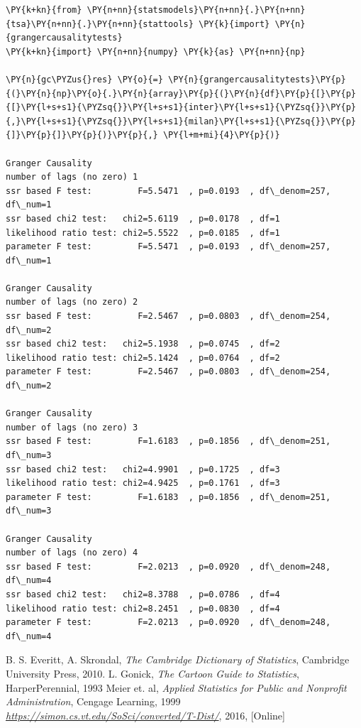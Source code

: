 \begin{codebox}[breakable, size=fbox, boxrule=1pt, pad at break*=1mm,colback=cellbackground, colframe=cellborder]
\begin{Verbatim}[commandchars=\\\{\}]
\PY{k+kn}{from} \PY{n+nn}{statsmodels}\PY{n+nn}{.}\PY{n+nn}{tsa}\PY{n+nn}{.}\PY{n+nn}{stattools} \PY{k}{import} \PY{n}{grangercausalitytests}
\PY{k+kn}{import} \PY{n+nn}{numpy} \PY{k}{as} \PY{n+nn}{np}

\PY{n}{gc\PYZus{}res} \PY{o}{=} \PY{n}{grangercausalitytests}\PY{p}{(}\PY{n}{np}\PY{o}{.}\PY{n}{array}\PY{p}{(}\PY{n}{df}\PY{p}{[}\PY{p}{[}\PY{l+s+s1}{\PYZsq{}}\PY{l+s+s1}{inter}\PY{l+s+s1}{\PYZsq{}}\PY{p}{,}\PY{l+s+s1}{\PYZsq{}}\PY{l+s+s1}{milan}\PY{l+s+s1}{\PYZsq{}}\PY{p}{]}\PY{p}{]}\PY{p}{)}\PY{p}{,} \PY{l+m+mi}{4}\PY{p}{)}

Granger Causality
number of lags (no zero) 1
ssr based F test:         F=5.5471  , p=0.0193  , df\_denom=257, df\_num=1
ssr based chi2 test:   chi2=5.6119  , p=0.0178  , df=1
likelihood ratio test: chi2=5.5522  , p=0.0185  , df=1
parameter F test:         F=5.5471  , p=0.0193  , df\_denom=257, df\_num=1

Granger Causality
number of lags (no zero) 2
ssr based F test:         F=2.5467  , p=0.0803  , df\_denom=254, df\_num=2
ssr based chi2 test:   chi2=5.1938  , p=0.0745  , df=2
likelihood ratio test: chi2=5.1424  , p=0.0764  , df=2
parameter F test:         F=2.5467  , p=0.0803  , df\_denom=254, df\_num=2

Granger Causality
number of lags (no zero) 3
ssr based F test:         F=1.6183  , p=0.1856  , df\_denom=251, df\_num=3
ssr based chi2 test:   chi2=4.9901  , p=0.1725  , df=3
likelihood ratio test: chi2=4.9425  , p=0.1761  , df=3
parameter F test:         F=1.6183  , p=0.1856  , df\_denom=251, df\_num=3

Granger Causality
number of lags (no zero) 4
ssr based F test:         F=2.0213  , p=0.0920  , df\_denom=248, df\_num=4
ssr based chi2 test:   chi2=8.3788  , p=0.0786  , df=4
likelihood ratio test: chi2=8.2451  , p=0.0830  , df=4
parameter F test:         F=2.0213  , p=0.0920  , df\_denom=248, df\_num=4
\end{Verbatim}
\end{codebox}

\begin{thebibliography}{9}
 B. S. Everitt, A. Skrondal, \emph{The Cambridge
	Dictionary of Statistics}, Cambridge University Press, 2010. 
 L. Gonick, \emph{The Cartoon Guide to Statistics}, HarperPerennial, 1993
 Meier et. al, \emph{Applied Statistics for Public and Nonprofit Administration}, Cengage Learning, 1999
 \href{}{\emph{https://simon.cs.vt.edu/SoSci/converted/T-Dist/}}, 2016, [Online]
\end{thebibliography}
